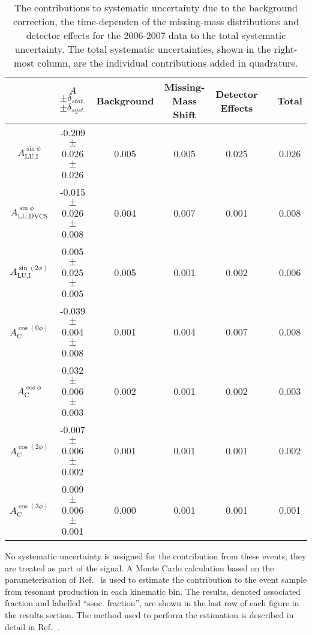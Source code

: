 \begin{table}[H]
 \begin{center}
\resizebox{16cm}{!} {
 \begin{tabular}{|c|c|c|c|c|c|c|}
  \hline
 & $A$ $\pm \delta_{stat.}$ $\pm \delta_{syst.}$ & Background & Missing-Mass Shift & Detector Effects & & Total \\
  \hline
  \hline
  $A_{\textrm{LU,I}}^{\sin\phi}$ & -0.209  $\pm$  0.026  $\pm$   0.026 & 0.005 & 0.005 & 0.025 & & 0.026 \\
  \hline
  $A_{\textrm{LU,DVCS}}^{\sin\phi}$ & -0.015  $\pm$  0.026  $\pm$  0.008 & 0.004 & 0.007 & 0.001 & & 0.008 \\
  \hline
  $A_{\textrm{LU,I}}^{\sin(2\phi)}$ & 0.005  $\pm$  0.025  $\pm$   0.005 & 0.005 & 0.001 & 0.002 & & 0.006 \\
  \hline
  \hline
  $A_{\textrm{C}}^{\cos(0\phi)}$ & -0.039 $\pm$  0.004 $\pm$  0.008 & 0.001 & 0.004 & 0.007 & & 0.008 \\
  \hline
  $A_{\textrm{C}}^{\cos\phi}$ & 0.032  $\pm$  0.006 $\pm$   0.003 & 0.002 & 0.001 & 0.002 & & 0.003 \\
  \hline
  $A_{\textrm{C}}^{\cos(2\phi)}$ & -0.007  $\pm$  0.006  $\pm$   0.002 & 0.001 & 0.001 & 0.001 & & 0.002 \\
  \hline
  $A_{\textrm{C}}^{\cos(3\phi)}$ & 0.009  $\pm$   0.006   $\pm$   0.001 & 0.000 & 0.001 & 0.001 & & 0.001 \\
  \hline
 \end{tabular}
}
  \caption{The contributions to  systematic uncertainty due to the
background correction, the time-dependen of the missing-mass
distributions and detector effects for the 2006-2007 data to the total
systematic uncertainty. The total systematic uncertainties, shown in the
right-most column, are the individual contributions added in quadrature.}
  \label{table_systematic_contributions_0607}
\end{center}
\end{table}

No systematic uncertainty is assigned for the contribution from these events; they are treated as part of the signal. A Monte Carlo calculation based on the parameterisation of Ref.~\cite{Bra76} is used to estimate the contribution to the event sample from resonant production in each kinematic bin. The results, denoted associated fraction and labelled ``ssoc. fraction'', are shown in the last row of each figure in the results section. The method used to perform the estimation is described in detail in
Ref.~\cite{Air08}.

